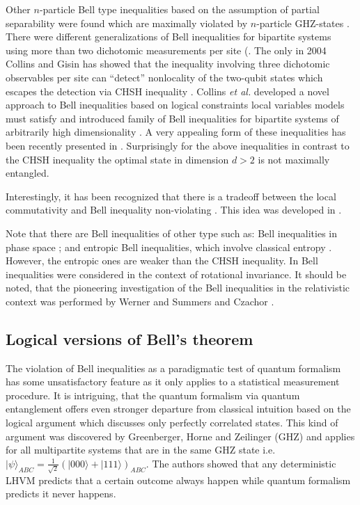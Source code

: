\documentclass[twocolumn,aps,rmp]{revtex4}
\begin{document}
Other $n$-particle Bell type inequalities based on the assumption of
partial separability were found which are maximally violated by
$n$-particle GHZ-states \cite {Svetlichny}. There were different
generalizations of Bell inequalities for bipartite systems using more
than two dichotomic measurements per site (\cite
{Sliwa,CG,Zukowski06,PitowskyS_nonloc2001}. The only in 2004 Collins
and Gisin has showed that the inequality involving three dichotomic
observables per site can ``detect'' nonlocality of the two-qubit
states which escapes the detection via CHSH inequality
\cite{CG}. Collins \emph{et al.} developed a novel approach to Bell
inequalities based on logical constraints local variables models must
satisfy and introduced family of Bell inequalities for bipartite
systems of arbitrarily high dimensionality \cite{CollinsGLMP-Bell-hdim}. A very
appealing form of these inequalities has been recently presented in
\cite{ZohrenGill}. Surprisingly for the above inequalities in contrast
to the CHSH inequality the optimal state in dimension $d>2$ is not
maximally entangled.

Interestingly, it has been recognized that there is a tradeoff
between the local commutativity and Bell inequality non-violating \cite{Roy-noncomut-Bell-2007}. This idea was developed in \cite{SeevinckU-loc-com-Bell-2007}.

Note that there are Bell inequalities of other type such as: Bell
inequalities in phase space \cite{AubersonMRS2003}; and entropic Bell
inequalities, which involve classical entropy
\cite{BraunsteinC1988}. However, the entropic ones are weaker than the
CHSH inequality. In \cite{NagataLWZ2004} Bell inequalities
were considered in the context of rotational invariance.
It should be noted, that the pioneering investigation
of the Bell inequalities in the relativistic context was performed by
Werner and Summers \cite{SummersW} and Czachor \cite{Czachor1}.


\subsection{Logical versions of Bell's theorem}
\label{subsec:logicBell}

The violation of Bell inequalities as a paradigmatic test of quantum
formalism has some unsatisfactory feature as it only applies to a
statistical measurement procedure. It is intriguing, that the quantum
formalism via quantum entanglement offers even stronger departure from
classical intuition based on the logical argument which discusses only
perfectly correlated states. This kind of argument was discovered by
Greenberger, Horne and Zeilinger (GHZ) and applies for all
multipartite systems that are in the same GHZ state i.e.
$|\psi\rangle_{ABC}=\frac{1}{\sqrt{2}}(|000\rangle+|111\rangle)_{ABC}$.
The authors showed that any deterministic LHVM predicts that a certain
outcome always happen while quantum formalism predicts it never
happens.
\end{document}
